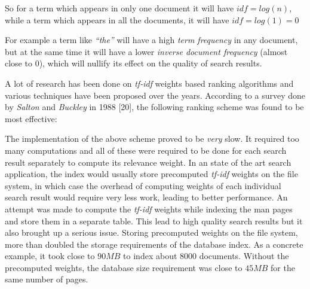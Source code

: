 \documentclass[letterpaper,twocolumn,10pt]{article}
\begin{document}
\begin{description}
So for a term which appears in only one document it will have
$idf = log(n)$,
while a term which appears in all the documents, it will have
$idf = log(1) = 0$

For example a term like \textit{``the''} will have a high
\textit{term frequency} in any
document, but at the same time it will have a lower \textit{inverse document frequency} (almost close to $0$), which will nullify its effect on the quality of search results.

A lot of research has been done on \textit{tf-idf} weights based ranking
algorithms and various techniques have been proposed over the years. According
to a survey done by \textit{Salton} and \textit{Buckley} in 1988 [20], the
following ranking scheme was found to be most effective:

\begin{center}
\end{center}

The implementation of the above scheme proved to be \emph{very} slow. It required
too many computations and all of these were required to be done for each
search result separately to compute its relevance weight. In an state of the
art search application, the index would usually store precomputed \textit{tf-idf}
weights on the file system, in which case the overhead of computing weights of
each individual search result would require very less work, leading to better
performance. An attempt was made to compute the \textit{tf-idf} weights while
indexing the man pages and store them in a separate table. This lead to high
quality search results but it also brought up a serious issue. Storing
precomputed weights on the file system, more than doubled the storage
requirements of the database index. As a concrete example, it took close
to $90 MB$ to index about $8000$ documents. Without the precomputed weights, 
the database size requirement was close to $45 MB$ for the same number of pages.
\end{description}
\end{document}
